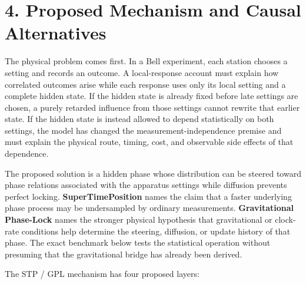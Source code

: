 \documentclass[
  american,
  11pt,
  letterpaper,
]{article}
\begin{document}
\section{4. Proposed Mechanism and Causal Alternatives}\label{proposed-mechanism-and-causal-alternatives}

The physical problem comes first. In a Bell experiment, each station chooses a setting and records an outcome. A local-response account must explain how correlated outcomes arise while each response uses only its local setting and a complete hidden state. If the hidden state is already fixed before late settings are chosen, a purely retarded influence from those settings cannot rewrite that earlier state. If the hidden state is instead allowed to depend statistically on both settings, the model has changed the measurement-independence premise and must explain the physical route, timing, cost, and observable side effects of that dependence.

The proposed solution is a hidden phase whose distribution can be steered toward phase relations associated with the apparatus settings while diffusion prevents perfect locking. \textbf{SuperTimePosition} names the claim that a faster underlying phase process may be undersampled by ordinary measurements. \textbf{Gravitational Phase-Lock} names the stronger physical hypothesis that gravitational or clock-rate conditions help determine the steering, diffusion, or update history of that phase. The exact benchmark below tests the statistical operation without presuming that the gravitational bridge has already been derived.

The STP / GPL mechanism has four proposed layers:
\end{document}
